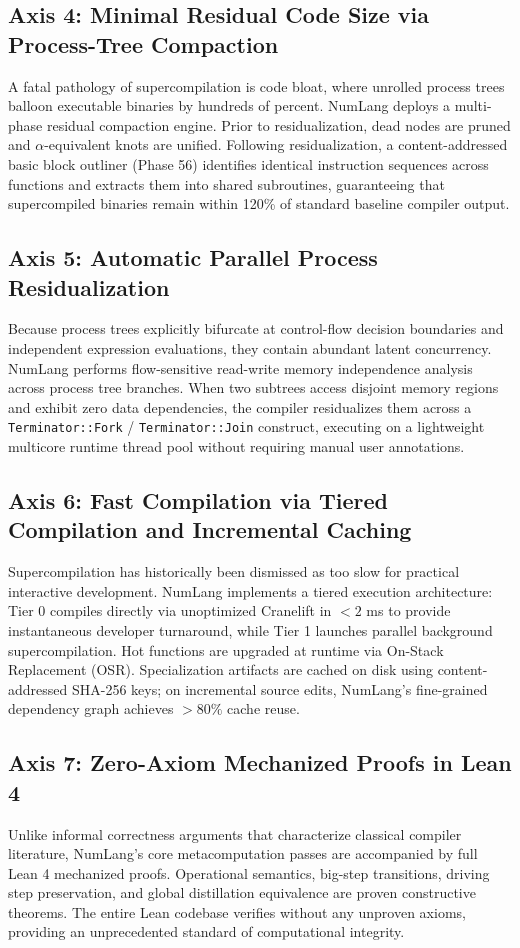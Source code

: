 \subsection{Axis 4: Minimal Residual Code Size via Process-Tree Compaction}
A fatal pathology of supercompilation is code bloat, where unrolled process trees balloon executable binaries by hundreds of percent. NumLang deploys a multi-phase residual compaction engine. Prior to residualization, dead nodes are pruned and $\alpha$-equivalent knots are unified. Following residualization, a content-addressed basic block outliner (Phase 56) identifies identical instruction sequences across functions and extracts them into shared subroutines, guaranteeing that supercompiled binaries remain within 120\% of standard baseline compiler output.

\subsection{Axis 5: Automatic Parallel Process Residualization}
Because process trees explicitly bifurcate at control-flow decision boundaries and independent expression evaluations, they contain abundant latent concurrency. NumLang performs flow-sensitive read-write memory independence analysis across process tree branches. When two subtrees access disjoint memory regions and exhibit zero data dependencies, the compiler residualizes them across a \texttt{Terminator::Fork} / \texttt{Terminator::Join} construct, executing on a lightweight multicore runtime thread pool without requiring manual user annotations.

\subsection{Axis 6: Fast Compilation via Tiered Compilation and Incremental Caching}
Supercompilation has historically been dismissed as too slow for practical interactive development. NumLang implements a tiered execution architecture: Tier 0 compiles directly via unoptimized Cranelift in $<2$ ms to provide instantaneous developer turnaround, while Tier 1 launches parallel background supercompilation. Hot functions are upgraded at runtime via On-Stack Replacement (OSR). Specialization artifacts are cached on disk using content-addressed SHA-256 keys; on incremental source edits, NumLang's fine-grained dependency graph achieves $>80\%$ cache reuse.

\subsection{Axis 7: Zero-Axiom Mechanized Proofs in Lean 4}
Unlike informal correctness arguments that characterize classical compiler literature, NumLang's core metacomputation passes are accompanied by full Lean 4 mechanized proofs. Operational semantics, big-step transitions, driving step preservation, and global distillation equivalence are proven constructive theorems. The entire Lean codebase verifies without any unproven axioms, providing an unprecedented standard of computational integrity.

